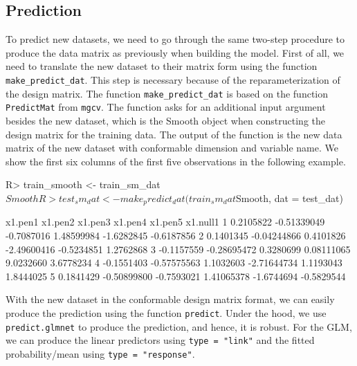 \documentclass[
]{jss}
\begin{document}
\subsection{Prediction}

To predict new datasets, we need to go through the same two-step
procedure to produce the data matrix as previously when building the
model. First of all, we need to translate the new dataset to their
matrix form using the function \texttt{make\_predict\_dat}. This step is
necessary because of the reparameterization of the design matrix. The
function \texttt{make\_predict\_dat} is based on the function
\texttt{PredictMat} from \texttt{mgcv}. The function asks for an
additional input argument besides the new dataset, which is the Smooth
object when constructing the design matrix for the training data. The
output of the function is the new data matrix of the new dataset with
conformable dimension and variable name. We show the first six columns
of the first five observations in the following example.

\begin{CodeChunk}
\begin{CodeInput}
R> train_smooth <- train_sm_dat$Smooth
R> test_sm_dat <- make_predict_dat(train_sm_dat$Smooth, dat = test_dat)
\end{CodeInput}
\end{CodeChunk}

\begin{CodeChunk}
\begin{CodeOutput}
     x1.pen1     x1.pen2    x1.pen3     x1.pen4    x1.pen5   x1.null1
1  0.2105822 -0.51339049 -0.7087016  1.48599984 -1.6282845 -0.6187856
2  0.1401345 -0.04244866  0.4101826 -2.49600416 -0.5234851  1.2762868
3 -0.1157559 -0.28695472  0.3280699  0.08111065  9.0232660  3.6778234
4 -0.1551403 -0.57575563  1.1032603 -2.71644734  1.1193043  1.8444025
5  0.1841429 -0.50899800 -0.7593021  1.41065378 -1.6744694 -0.5829544
\end{CodeOutput}
\end{CodeChunk}

With the new dataset in the conformable design matrix format, we can
easily produce the prediction using the function \texttt{predict}. Under
the hood, we use \texttt{predict.glmnet} to produce the prediction, and
hence, it is robust. For the GLM, we can produce the linear predictors
using \texttt{type\ =\ "link"} and the fitted probability/mean using
\texttt{type\ =\ "response"}.

\begin{CodeChunk}
\end{CodeChunk}
\end{document}
